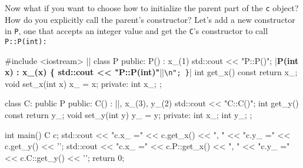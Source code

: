 Now what if you want to choose how to initialize the parent part of the
\verb!c! object? How do you explicitly call the parent's constructor?
Let's add a new constructor in \verb!P!, one that accepts an integer
value and get the \verb!C!'s constructor to call \verb!P::P(int):!
\begin{consolethree}[escapeinside=||]
#include <iostream>
||
class P
{
public:
        P() : x_(1) { std::cout << "P::P()\n"; }
        |\textbf{P(int x) : x\_(x) \{ std::cout << "P::P(int)"}||\verb!\n"; }!|
        int get_x() const { return x_; }
        void set_x(int x) { x_ = x; }
private:
        int x_;
};

class C: public P
{
public:
        C() : ||, x_(3), y_(2)
                     { std::cout << "C::C()"; }
        int get_y() const { return y_; }
        void set_y(int y) { y_ = y; }
private:
        int x_;
        int y_;
};

int main()
{   
    C c;
    std::cout << "c.x_ =" << c.get_x() << ", "
              << "c.y_ =" << c.get_y() << '\n';
    std::cout << "c.x_ =" << c.P::get_x() << ", "
              << "c.y_ =" << c.C::get_y() << '\n';
    return 0;
}
\end{consolethree}

